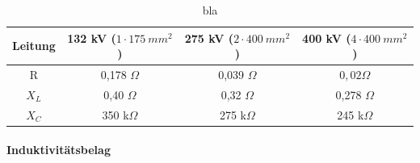 \setlength{\tabcolsep}{10pt}
\renewcommand{\arraystretch}{1.5}
\begin{table}[tbhn]
\begin{center}
\noindent
\begin{tabular}{|c|ccc|}
\hline 
Leitung & 132 kV ($1\cdot 175\ mm^2$) & 275 kV ($2\cdot 400\ mm^2$) & 400 kV ($4\cdot 400\ mm^2$) \\ 
\hline 
R & 0,178 $\Omega$ & 0,039 $\Omega$ & $0,02 \Omega$ \\ 

$X_L$ & 0,40 $\Omega$ & 0,32 $\Omega$ & 0,278 $\Omega$ \\ 

$X_C$ & 350 k$\Omega$ & 275 k$\Omega$ & 245 k$\Omega$ \\ 
\hline 
\end{tabular} 
\end{center}
\caption{bla} %
\label{Tab:freileitung}
\end{table}

\paragraph{Induktivitätsbelag}


